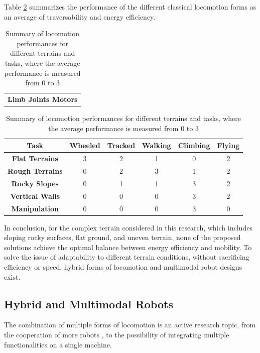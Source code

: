 Table \ref{table:locomotion_summary} summarizes the performance of the different classical locomotion forms as an average of traversability and energy efficiency.

\begin{table}[H]
\centering 
    \caption{Summary of locomotion performances for different terrains and tasks, where the average performance is measured from 0 to 3}
    \label{table:locomotion_summary}
    \begin{tabular}{ c }
    \textbf{Limb Joints Motors}
    \end{tabular}
    \begin{tabular}{| c | c | c | c | c | c |}
    \hline
    \rowcolor{bluepoli!40}
     \textbf{Task} &  Wheeled & Tracked & Walking & Climbing & Flying\T\B \\
    \hline \hline
    \textbf{Flat Terrains} & \cellcolor{bluepoli!20}3 & 2 & 1 & 0  & 2  \T\B\\
    \hline 
    \textbf{Rough Terrains} & 0 & 2 & \cellcolor{bluepoli!20}3 & 1  & 2 \T\B\\
    \hline
    \textbf{Rocky Slopes} & 0 & 1 & 1 & \cellcolor{bluepoli!20}3 & 2 \T\B\\
    \hline
    \textbf{Vertical Walls} & 0 & 0 & 0 & \cellcolor{bluepoli!20}3 & 2 \T\B\\
    \hline
    \textbf{Manipulation} & 0 & 0 & 0 & \cellcolor{bluepoli!20}3 & 0 \B\\
    \hline
    \end{tabular}
\end{table}


In conclusion, for the complex terrain considered in this research, which includes sloping rocky surfaces, flat ground, and uneven terrain, none of the proposed solutions achieve the optimal balance between energy efficiency and mobility.
To solve the issue of adaptability to different terrain conditions, without sacrificing efficiency or speed, hybrid forms of locomotion and multimodal robot designs exist. 

\subsection{Hybrid and Multimodal Robots}
\label{subsec:hybrid_robots}

The combination of multiple forms of locomotion is an active research topic, from the cooperation of more robots
\cite{MultimodalityROBOTS}, to the possibility of integrating multiple functionalities on a single machine.

